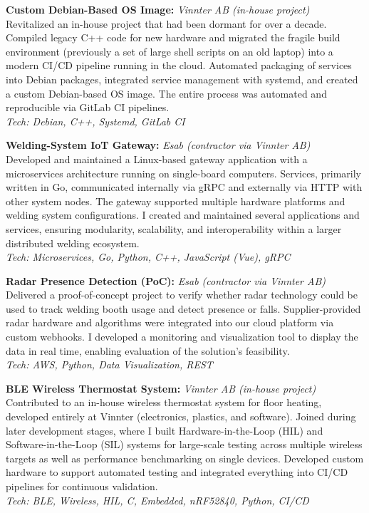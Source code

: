 \textbf{Custom Debian-Based OS Image:} \textit{Vinnter AB (in-house project)} \\
Revitalized an in-house project that had been dormant for over a decade. Compiled legacy C++ code for new hardware and migrated the fragile build environment (previously a set of large shell scripts on an old laptop) into a modern CI/CD pipeline running in the cloud. Automated packaging of services into Debian packages, integrated service management with systemd, and created a custom Debian-based OS image. The entire process was automated and reproducible via GitLab CI pipelines. \\
\textit{Tech: Debian, C++, Systemd, GitLab CI} \\
\SmallSep

\textbf{Welding-System IoT Gateway:} \textit{Esab (contractor via Vinnter AB)} \\
Developed and maintained a Linux-based gateway application with a microservices architecture running on single-board computers. Services, primarily written in Go, communicated internally via gRPC and externally via HTTP with other system nodes. The gateway supported multiple hardware platforms and welding system configurations. I created and maintained several applications and services, ensuring modularity, scalability, and interoperability within a larger distributed welding ecosystem. \\
\textit{Tech: Microservices, Go, Python, C++, JavaScript (Vue), gRPC} \\
\SmallSep

\textbf{Radar Presence Detection (PoC):} \textit{Esab (contractor via Vinnter AB)} \\
Delivered a proof-of-concept project to verify whether radar technology could be used to track welding booth usage and detect presence or falls. Supplier-provided radar hardware and algorithms were integrated into our cloud platform via custom webhooks. I developed a monitoring and visualization tool to display the data in real time, enabling evaluation of the solution’s feasibility. \\
\textit{Tech: AWS, Python, Data Visualization, REST} \\
\SmallSep

\textbf{BLE Wireless Thermostat System:} \textit{Vinnter AB (in-house project)} \\
Contributed to an in-house wireless thermostat system for floor heating, developed entirely at Vinnter (electronics, plastics, and software). Joined during later development stages, where I built Hardware-in-the-Loop (HIL) and Software-in-the-Loop (SIL) systems for large-scale testing across multiple wireless targets as well as performance benchmarking on single devices. Developed custom hardware to support automated testing and integrated everything into CI/CD pipelines for continuous validation. \\
\textit{Tech: BLE, Wireless, HIL, C, Embedded, nRF52840, Python, CI/CD} \\
\SmallSep


